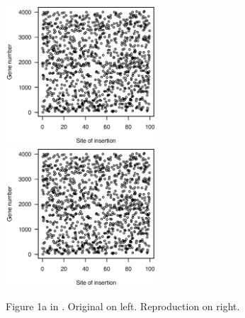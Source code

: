 \begin{figure}
\includegraphics[viewport=133 224 464 528, width=0.50\textwidth]{../original/Nov02/R/Figs/fig1.ps}
\hfill
\includegraphics[viewport=133 224 464 528, width=0.50\textwidth]{../reproduction/Figs/fig1.ps}

\caption{Figure 1a in \citet{lamichhane2003}. Original on left. Reproduction on right.\label{fig:fig1a}}
\end{figure}

